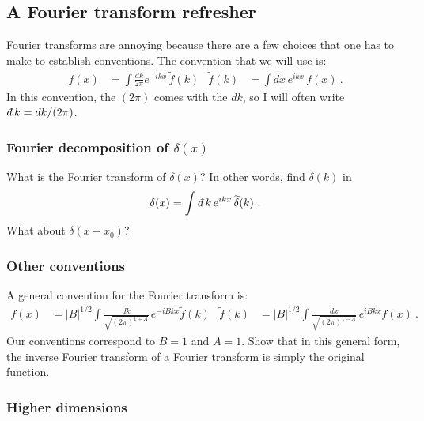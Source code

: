 \documentclass[12pt]{article}
\numberwithin{equation}{subsection}    %
\renewcommand{\tilde}{\widetilde}   %
\newcommand{\dbar}{d\mkern-6mu\mathchar'26}    %
\begin{document}
\subsection{A Fourier transform refresher}

Fourier transforms are annoying because there are a few choices that one has to make to establish conventions. The convention that we will use is: %
\begin{align}
	f(x) &= \int \frac{dk}{2\pi} e^{-ikx}\, \tilde f(k)
	&
	\tilde f(k) &= \int dx \, e^{ikx}\, f(x) \ .
\end{align}
In this convention, the $(2\pi)$ comes with the $dk$, so I will often write $\dbar k = dk/(2\pi)$.

\subsubsection{Fourier decomposition of $\delta(x)$}

What is the Fourier transform of $\delta(x)$? In other words, find $\tilde \delta(k)$ in
\begin{align}
	\delta(x) = \int \dbar k \, e^{ikx}\, \tilde\delta(k) \ .
\end{align}
What about $\delta(x-x_0)$?

\subsubsection{Other conventions}

A general convention for the Fourier transform is:
\begin{align}
	f(x) &= |B|^{1/2}
	\int \frac{dk}{\sqrt{(2\pi)^{1+A}}} \, e^{-iBkx} \tilde f(k)
	&
	\tilde f(k) &= |B|^{1/2}
	\int \frac{dx}{\sqrt{(2\pi)^{1-A}}} \, e^{iBkx} f(x) \ .
\end{align}
Our conventions correspond to $B=1$ and $A=1$. Show that in this general form, the inverse Fourier transform of a Fourier transform is simply the original function. 

\subsubsection{Higher dimensions}
\end{document}
